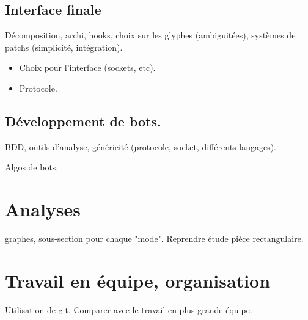 \documentclass{article}
\begin{document}
\subsection{Interface finale}

Décomposition, archi, hooks, choix sur les glyphes (ambiguitées), systèmes de
patchs (simplicité, intégration).

\begin{itemize}
\item Choix pour l'interface (sockets, etc).
\item Protocole.
\end{itemize}

\subsection{Développement de bots.}

BDD, outils d'analyse, généricité (protocole, socket, différents langages).

Algos de bots.


\section{Analyses}

graphes, sous-section pour chaque "mode". Reprendre étude pièce rectangulaire.


\section{Travail en équipe, organisation}

Utilisation de git.
Comparer avec le travail en plus grande équipe.
\end{document}
